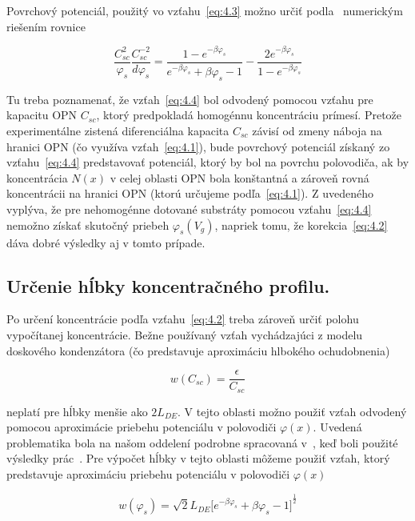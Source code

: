 Povrchový potenciál, použitý vo vzťahu~\ref{eq:4.3} možno určiť
podla~\cite{4.7} numerickým riešením rovnice

\begin{equation}\label{eq:4.4}
  \frac{C_{sc}^{2}}{\varphi_{s}}\frac{C_{sc}^{-2}}{d\varphi_{s}}=\frac{1-e^{-\beta\varphi_{s}}}{e^{-\beta\varphi_{s}}+\beta\varphi_{s}-1}-\frac{2e^{-\beta\varphi_{s}}} {1-e^{-\beta\varphi_{s}}}
\end{equation}

Tu treba poznamenať, že vzťah~\ref{eq:4.4} bol odvodený pomocou vzťahu
pre kapacitu OPN $C_{sc}$, ktorý predpokladá homogénnu koncentráciu
prímesí. Pretože experimentálne zistená diferenciálna kapacita
$C_{sc}$ závisí od zmeny náboja na hranici OPN (čo využíva
vzťah~\ref{eq:4.1}), bude povrchový potenciál získaný zo
vzťahu~\ref{eq:4.4} predstavovať potenciál, ktorý by bol na povrchu
polovodiča, ak by koncentrácia $N(x)$ v celej oblasti OPN bola
konštantná a zároveň rovná koncentrácii na hranici OPN (ktorú určujeme
podľa~\ref{eq:4.1}). Z uvedeného vyplýva, že pre nehomogénne dotované
substráty pomocou vzťahu~\ref{eq:4.4} nemožno získať skutočný priebeh
$\varphi_{s}(V_{g})$, napriek tomu, že korekcia~\ref{eq:4.2} dáva
dobré výsledky aj v tomto prípade.

\subsection[Určenie hĺbky koncentračného profilu.]{Určenie hĺbky koncentračného profilu.}\label{sec:4.1.2}

Po určení koncentrácie podľa vzťahu~\ref{eq:4.2} treba zároveň určiť
polohu vypočítanej koncentrácie. Bežne používaný vzťah vychádzajúci z
modelu doskového kondenzátora (čo predstavuje aproximáciu hlbokého
ochudobnenia)

\begin{equation}\label{eq:4.5}
  w(C_{sc})=\frac{\epsilon}{C_{sc}}
\end{equation}

neplatí pre hĺbky menšie ako $2L_{DE}$. V tejto oblasti možno použiť
vzťah odvodený pomocou aproximácie priebehu potenciálu v polovodiči
$\varphi(x)$. Uvedená problematika bola na našom oddelení podrobne
spracovaná v~\cite{4.13, 4.14}, keď boli použité výsledky
prác~\cite{4.9, 4.10, 4.11}. Pre výpočet hĺbky v tejto oblasti môžeme
použiť vzťah, ktorý predstavuje aproximáciu priebehu potenciálu v
polovodiči $\varphi(x)$~\cite{I.1}

\begin{equation}\label{eq:4.6}
  w(\varphi_{s})=\sqrt{2}L_{DE}{\big[e^{-\beta\varphi_{s}}+\beta\varphi_{s}-1\big]}^{\frac{1}{2}}
\end{equation}

